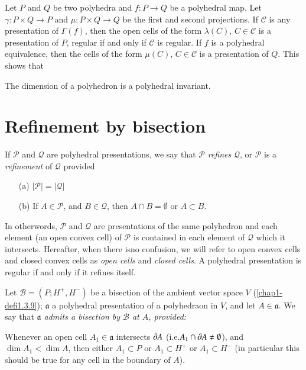 Let $P$ and $Q$ be two polyhedra and $f:P\to Q$ be a polyhedral map. Let $\gamma:P\times Q\to P$ and $\mu:P\times Q\to Q$ be the first and second projections. If $\mathscr{C}$ is any presentation of $\Gamma(f)$, then the open cells of the form $\lambda(C)$, $C\in \mathscr{C}$ is a presentation of $P$, regular if and only if $\mathscr{C}$ is regular. If $f$ is a polyhedral equivalence, then the cells of the form $\mu(C)$, $C\in\mathscr{C}$ is a presentation of $Q$. This shows that

\setcounter{proposition}{11}
\begin{proposition}\label{chap1-prop1.6.12}
The dimension of a polyhedron is a polyhedral invariant.
\end{proposition}

\section{Refinement by bisection}\label{chap1-sec1.7}

\begin{definition}\label{chap1-defi1.7.1}
If $\mathscr{P}$ and $\mathcal{Q}$ are polyhedral presentations, we say that $\mathscr{P}$ {\em refines} $\mathcal{Q}$, or $\mathscr{P}$ is a {\em refinement} of $\mathcal{Q}$ provided
\begin{itemize}
\item[(a)] $|\mathscr{P}|=|\mathcal{Q}|$

\item[(b)] If $A\in \mathscr{P}$, and $B\in \mathcal{Q}$, then $A\cap B=\emptyset$ or $A\subset B$.
\end{itemize}
\end{definition}

In otherwords, $\mathscr{P}$ and $\mathcal{Q}$ are presentations of the same polyhedron and each element (an open convex cell) of $\mathscr{P}$ is contained in each element of $\mathcal{Q}$ which it intersects. Hereafter, when there is\pageoriginale no confusion, we will refer to open convex cells and closed convex cells as {\em open cells} and {\em closed cells}. A polyhedral presentation is regular if and only if it refines itself.

Let $\mathscr{B}=(P;H^{+},H^{-})$ be a bisection of the ambient vector space $V$ 
(\ref{chap1-defi1.3.9}); $\mathfrak{a}$ a polyhedral presentation of a polyhedraon in $V$, and let $A\in \mathfrak{a}$. We say that {\em $\mathfrak{a}$ admits a bisection by $\mathscr{B}$ at $A$, provided:} 

Whenever an open cell $A_{1}\in \mathfrak{a}$ intersects $\partial A$ (i.e.\@ $A_{1}\cap \partial A\neq \emptyset$), and $\dim A_{1}<\dim A$, then either $A_{1}\subset P$ or $A_{1}\subset H^{+}$ or $A_{1}\subset H^{-}$ (in particular this should be true for any cell in the boundary of $A$).

